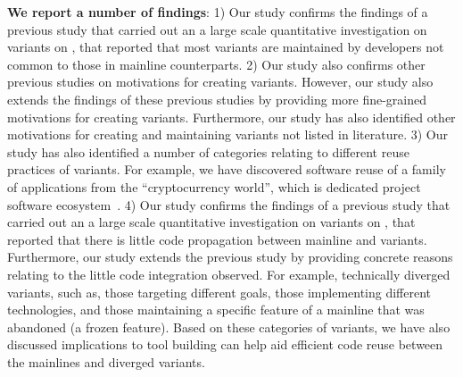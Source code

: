\nd \textbf{We report a number of findings}: 1) Our study confirms the findings of a previous study that carried out an a large scale quantitative investigation on variants on \gh, that reported that most variants are maintained by developers not common to those in mainline counterparts. 
2) Our study also confirms other previous studies on motivations for creating variants. However, our study also extends the findings of these previous studies by providing more fine-grained motivations for creating variants. Furthermore, our study has also identified other motivations for creating and maintaining variants not listed in literature. 
3) Our study has also identified a number of categories relating to different reuse practices of variants. For example, we have discovered software reuse of a family of applications from the ``cryptocurrency world'', which is dedicated project software ecosystem~\cite{tommens:2020}. 
4) Our study confirms the findings of a previous study that carried out an a large scale quantitative investigation on variants on \gh, that reported that there is little code propagation between mainline and variants. Furthermore, our study extends the previous study by providing concrete reasons relating to the little code integration observed. For example, technically diverged variants, such as, those targeting different goals, those implementing different technologies, and those maintaining a specific feature of a mainline that was abandoned (a frozen feature). Based on these categories of variants, we have also discussed implications to tool building can help aid efficient code reuse between the mainlines and diverged variants.

